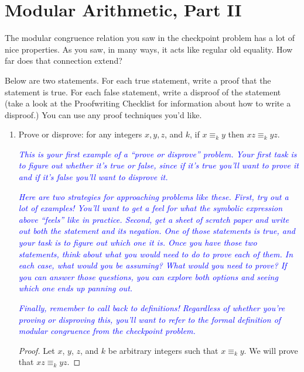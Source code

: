 \documentclass{article}
\renewcommand{\(}{\left(}
\renewcommand{\)}{\right)}
\theoremstyle{plain}
\theoremstyle{plain}
\theoremstyle{definition}
\begin{document}
\pagebreak

\section{Modular Arithmetic, Part II}

The modular congruence relation you saw in the checkpoint problem has a lot of nice properties. As you saw, in many ways, it acts like regular old equality. How far does that connection extend?

Below are two statements. For each true statement, write a proof that the statement is true. For each false statement, write a disproof of the statement (take a look at the Proofwriting Checklist for information about how to write a disproof.) You can use any proof techniques you'd like. 

\begin{enumerate}[label*=\roman*.,ref=\roman*]

\item Prove or disprove: for any integers $x, y, z$, and $k$, if $x \equiv_k y$ then $xz \equiv_k yz$.

\textit{\textcolor{blue}{This is your first example of a ``prove or disprove'' problem. Your first task is to figure out whether it's true or false, since if it's true you'll want to prove it and if it's false you'll want to disprove it.}}

\textit{\textcolor{blue}{Here are two strategies for approaching problems like these. First, try out a lot of examples! You'll want to get a feel for what the symbolic expression above ``feels'' like in practice. Second, get a sheet of scratch paper and write out both the statement and its negation. One of those statements is true, and your task is to figure out which one it is. Once you have those two statements, think about what you would need to do to prove each of them. In each case, what would you be assuming? What would you need to prove? If you can answer those questions, you can explore both options and seeing which one ends up panning out.}}

\textit{\textcolor{blue}{Finally, remember to call back to definitions! Regardless of whether you're proving or disproving this, you'll want to refer to the formal definition of modular congruence from the checkpoint problem.}}

\begin{shaded}
\begin{proof}
	Let $x$, $y$, $z$, and $k$ be arbitrary integers such that $x \equiv_k y$. We will prove that $xz \equiv_k yz$.
	

\end{proof}
\end{shaded}
\end{enumerate}
\end{document}
